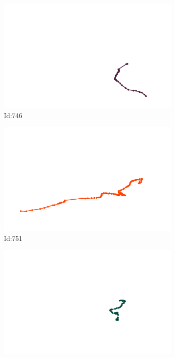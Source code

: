 \documentclass[12pt,twoside]{report}
\begin{document}
\begin{figure}
\begin{subfigure}[b]{0.20\textwidth}
\centering
\includegraphics[width=\textwidth]{../trajectories/746.png}
\caption{Id:746}
\end{subfigure}
\begin{subfigure}[b]{0.20\textwidth}
\centering
\includegraphics[width=\textwidth]{../trajectories/751.png}
\caption{Id:751}
\end{subfigure}
\begin{subfigure}[b]{0.20\textwidth}
\centering
\includegraphics[width=\textwidth]{../trajectories/804.png}

\end{subfigure}
\end{figure}
\end{document}
